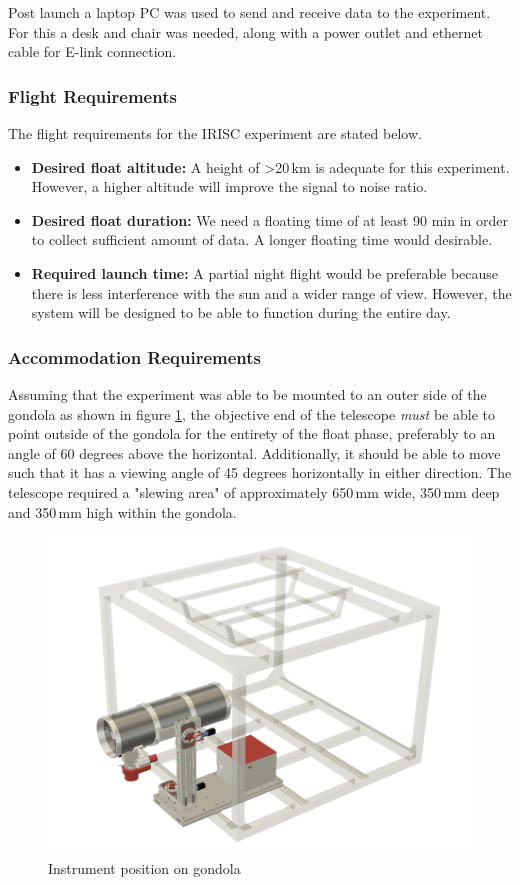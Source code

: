 Post launch a laptop PC was used to send and receive data to the experiment. For this a desk and chair was needed, along with a power outlet and ethernet cable for E-link connection.


\subsubsection{Flight Requirements}
The flight requirements for the IRISC experiment are stated below.
\begin{itemize}
	\item \textbf{Desired float altitude:} A height of >20\,km is adequate for this experiment. However, a higher altitude will improve the signal to noise ratio.
	\item \textbf{Desired float duration:} We need a floating time of at least 90 min in order to collect sufficient amount of data. A longer floating time would desirable.
	\item \textbf{Required launch time:} A partial night flight would be preferable because there is less interference with the sun and a wider range of view. However, the system will be designed to be able to function during the entire day.
\end{itemize}

\subsubsection{Accommodation Requirements}

Assuming that the experiment was able to be mounted to an outer side of the gondola as shown in figure \ref{accomrec}, the objective end of the telescope \textit{must} be able to point outside of the gondola for the entirety of the float phase, preferably to an angle of 60 degrees above the horizontal. Additionally, it should be able to move such that it has a viewing angle of 45 degrees horizontally in either direction. The telescope required a "slewing area" of approximately 650\,mm wide, 350\,mm deep and 350\,mm high within the gondola.

\begin{figure}[H]
	\centering
	\includegraphics[width=0.9\linewidth]{4-experiment-design/img/mechanical/ebox.png}
	\caption{Instrument position on gondola}
	\label{accomrec}
\end{figure}
